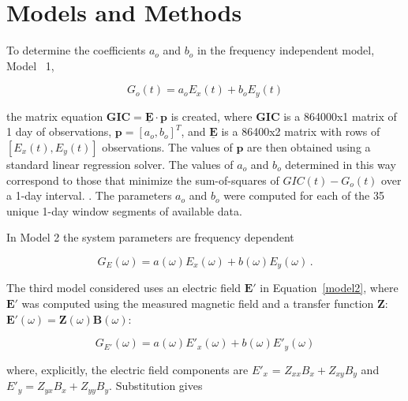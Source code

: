 \documentclass[draft,linenumbers]{agujournal2018}
\begin{document}
\section{Models and Methods}

To determine the coefficients $a_o$ and $b_o$ in the frequency independent model, Model ~1,

\begin{linenomath*}
\begin{equation}
G_o(t) = a_oE_x(t) + b_oE_y(t)
\label{model1}
\end{equation}
\end{linenomath*}

\noindent
the matrix equation $\mathbf{GIC} = \underline{\mathbf{E}}\cdot\mathbf{p}$ is created, where $\mathbf{GIC}$ is a 864000x1 matrix of 1 day of observations, $\mathbf{p} = [a_o,b_o]^T$, and $\underline{\mathbf{E}}$ is a 86400x2 matrix with rows of $[E_x(t), E_y(t)]$ observations. The values of $\mathbf{p}$ are then obtained using a standard linear regression solver. The values of $a_o$ and $b_o$ determined in this way correspond to those that minimize the sum-of-squares of $GIC(t)-G_o(t)$ over a 1-day interval. \citep[][ provided the mathematically equivalent closed-form equations.]{Pulkkinen2007}. The parameters $a_o$ and $b_o$ were computed for each of the 35 unique 1-day window segments of available data.

In Model 2 the system parameters are frequency dependent

\begin{linenomath*}
\begin{equation}
G_E(\omega) = a(\omega)E_x(\omega) + b(\omega)E_y(\omega)\,.
\label{model2}
\end{equation}
\end{linenomath*}

The third model considered uses an electric field $\mathbf{E}'$ in Equation~\ref{model2}, where $\mathbf{E}'$ was computed using the measured magnetic field and a transfer function $\boldsymbol{Z}$: $\mathbf{E}'(\omega) = \boldsymbol{Z}(\omega)\mathbf{B}(\omega)$:

\setcounter{equation}{2}
\begin{linenomath*}
\begin{equation}
G_{E'}(\omega) = a(\omega)E'_x(\omega) + b(\omega)E'_y(\omega)
\label{model3}
\end{equation}
\end{linenomath*}

\noindent
where, explicitly, the electric field components are $E'_x$ = $Z_{xx}B_x + Z_{xy}B_y$ and $E'_y = Z_{yx}B_x + Z_{yy}B_y$. Substitution gives
\end{document}
